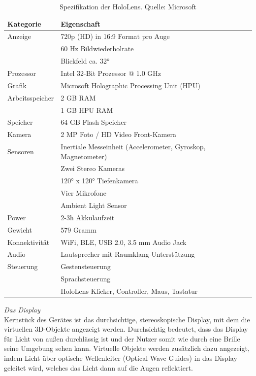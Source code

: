 \bgroup
\begin{table}[htb]
	\centering
	\begin{tabular}{l|l}
		Kategorie & Eigenschaft\\
		\hline
		Anzeige & 720p (HD) in 16:9 Format pro Auge\\
		& 60 Hz Bildwiederholrate\\
		& Blickfeld ca. 32°\\
		Prozessor & Intel 32-Bit Prozessor @ 1.0 GHz\\
		Grafik & Microsoft Holographic Processing Unit (HPU)\\
		Arbeitsspeicher & 2 GB RAM\\
		& 1 GB HPU RAM\\
		Speicher & 64 GB Flash Speicher\\
		Kamera & 2 MP Foto / HD Video Front-Kamera\\
		Sensoren & Inertiale Messeinheit (Accelerometer, Gyroskop, Magnetometer) \\
		& Zwei Stereo Kameras\\
		& 120° x 120° Tiefenkamera\\
		& Vier Mikrofone\\
		& Ambient Light Sensor\\
		Power & 2-3h Akkulaufzeit \\
		Gewicht & 579 Gramm \\
		Konnektivität & WiFi, BLE, USB 2.0, 3.5 mm Audio Jack \\
		Audio & Lautsprecher mit Raumklang-Unterstützung\\
		Steuerung & Gestensteuerung\\
		& Sprachsteuerung\\
		& HoloLens Klicker, Controller, Maus, Tastatur\\
	\end{tabular}\caption{\label{tab:hololens_tech_details} Spezifikation der HoloLens. Quelle: Microsoft}
\end{table}
\egroup

\vspace{4px}
\textit{Das Display}\\
Kernstück des Gerätes ist das durchsichtige, stereoskopische Display, mit dem die virtuellen 3D-Objekte angezeigt werden. Durchsichtig bedeutet, dass das Display für Licht von außen durchlässig ist und der Nutzer somit wie durch eine Brille seine Umgebung sehen kann. Virtuelle Objekte werden zusätzlich dazu angezeigt, indem Licht über optische Wellenleiter (Optical Wave Guides) in das Display geleitet wird, welches das Licht dann auf die Augen reflektiert.\\

